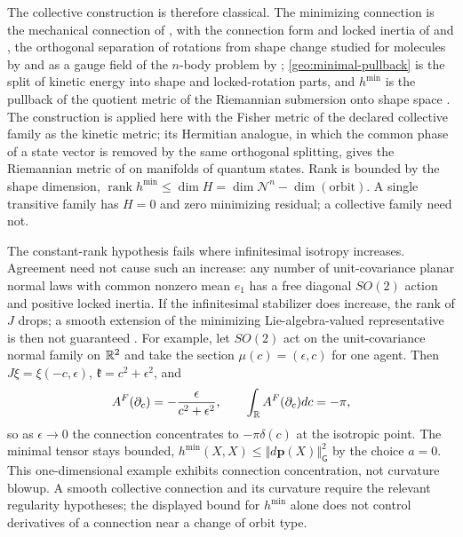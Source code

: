 The collective construction is therefore classical. The minimizing connection is the mechanical connection of \citet{Smale1970}, with the connection form and locked inertia of \citet{Kummer1981} and \citet{MarsdenMontgomeryRatiu1990}, the orthogonal separation of rotations from shape change studied for molecules by \citet{Guichardet1984} and as a gauge field of the $n$-body problem by \citet{LittlejohnReinsch1997}; \cref{geo:minimal-pullback} is the split of kinetic energy into shape and locked-rotation parts, and $h^{\min}$ is the pullback of the quotient metric of the Riemannian submersion onto shape space \citep{ONeill1966}. The construction is applied here with the Fisher metric of the declared collective family as the kinetic metric; its Hermitian analogue, in which the common phase of a state vector is removed by the same orthogonal splitting, gives the Riemannian metric of \citet{ProvostVallee1980} on manifolds of quantum states. Rank is bounded by the shape dimension, $\operatorname{rank}h^{\min}\le\dim H=\dim\mathcal N^n-\dim(\text{orbit})$. A single transitive family has $H=0$ and zero minimizing residual; a collective family need not.

The constant-rank hypothesis fails where infinitesimal isotropy increases. Agreement need not cause such an increase: any number of unit-covariance planar normal laws with common nonzero mean $e_1$ has a free diagonal $SO(2)$ action and positive locked inertia. If the infinitesimal stabilizer does increase, the rank of $J$ drops; a smooth extension of the minimizing Lie-algebra-valued representative is then not guaranteed \citep{LewisNigamOlver2005}. For example, let $SO(2)$ act on the unit-covariance normal family on $\mathbb R^2$ and take the section $\mu(c)=(\epsilon,c)$ for one agent. Then $J\xi=\xi(-c,\epsilon)$, $\mathfrak k=c^2+\epsilon^2$, and
\begin{equation}
A^F(\partial_c)=-\frac{\epsilon}{c^2+\epsilon^2},
\qquad
\int_{\mathbb R}A^F(\partial_c)dc=-\pi,
\end{equation}
so as $\epsilon\to0$ the connection concentrates to $-\pi\delta(c)$ at the isotropic point. The minimal tensor stays bounded, $h^{\min}(X,X)\le\Vert d\boldsymbol p(X)\Vert_{\mathsf G}^2$ by the choice $a=0$. This one-dimensional example exhibits connection concentration, not curvature blowup. A smooth collective connection and its curvature require the relevant regularity hypotheses; the displayed bound for $h^{\min}$ alone does not control derivatives of a connection near a change of orbit type.

